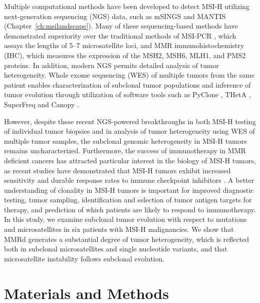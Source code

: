 Multiple computational methods have been developed to detect MSI-H utilizing next-generation sequencing (NGS) data, such as mSINGS \cite{salipante2014} and MANTIS \cite{kautto17} (Chapter~\ref{ch:msilandscape}). Many of these sequencing-based methods have demonstrated superiority over the traditional methods of MSI-PCR \cite{boland1998}, which assays the lengths of 5--7 microsatellite loci, and MMR immunohistochemistry (IHC), which measures the expression of the MSH2, MSH6, MLH1, and PMS2 proteins. In addition, modern NGS permits detailed analysis of tumor heterogeneity. Whole exome sequencing (WES) of multiple tumors from the same patient enables characterization of subclonal tumor populations and inference of tumor evolution \cite{savas2016,chen2019,krook2019_mcs} through utilization of software tools such as PyClone \cite{roth2014}, THetA \cite{oesper2013}, SuperFreq \cite{flensburg2020} and Canopy \cite{canopy}.

However, despite these recent NGS-powered breakthroughs in both MSI-H testing of individual tumor biopsies and in analysis of tumor heterogeneity using WES of multiple tumor samples, the subclonal genomic heterogeneity in MSI-H tumors remains uncharacterized. Furthermore, the success of immunotherapy in MMR deficient cancers has attracted particular interest in the biology of MSI-H tumors, as recent studies have demonstrated that MSI-H tumors exhibit increased sensitivity and durable response rates to immune checkpoint inhibitors \cite{le2015}. A better understanding of clonality in MSI-H tumors is important for improved diagnostic testing, tumor sampling, identification and selection of tumor antigen targets for therapy, and prediction of which patients are likely to respond to immunotherapy. In this study, we examine subclonal tumor evolution with respect to mutations and microsatellites in six patients with MSI-H malignancies. We show that MMRd generates a substantial degree of tumor heterogeneity, which is reflected both in subclonal microsatellites and single nucleotide variants, and that microsatellite instability follows subclonal evolution.

\section{Materials and Methods}

